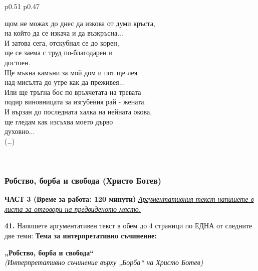 \documentclass[12pt,a4paper]{article}
\begin{document}
\begin{table}[h]
\begin{tabular}{p{0.51\textwidth} p{0.47\textwidth}}
\begin{minipage}[t]{\linewidth}
щом не можах до днес да изкова от думи кръста,\\
на който да се изкача и да възкръсна...\\

И затова сега, отскубнал се до корен,\\
ще се заема с труд по-благодарен и\\ достоен.\\

Ще мъкна камъни за мой дом и пот ще лея\\
над мисълта до утре как да преживея...\\

Или ще тръгна бос по връхчетата на тревата\\
подир виновницата за изгубения рай - жената.\\

И вързан до последната халка на нейната окова,\\
ще гледам как изсъхва моето дърво\\ духовно...\\

(…)
\end{minipage}
\\
\end{tabular}
\end{table}

\subsubsection{Робство, борба и свобода (Христо Ботев)}
\vspace{0.5cm}
\begin{center}
\textbf{ЧАСТ 3 (Време за работа: 120 минути)}
\vspace{0.2cm}
{\textit{\underline{Аргументативния текст напишете в листа за отговори на предвиденото място.}}}
\vspace{0.1cm}
\end{center}
\textbf{41.} Напишете аргументативен текст в обем до 4 страници по ЕДНА от следните две теми:
\vspace{0.2cm}
\textbf{Тема за интерпретативно съчинение:}
\vspace{0.1cm}
\begin{center}
\textbf{„Робство, борба и свобода“}
\\
\textit{(Интерпретативно съчинение върху „Борба“ на Христо Ботев)}
\end{center}
\end{document}

